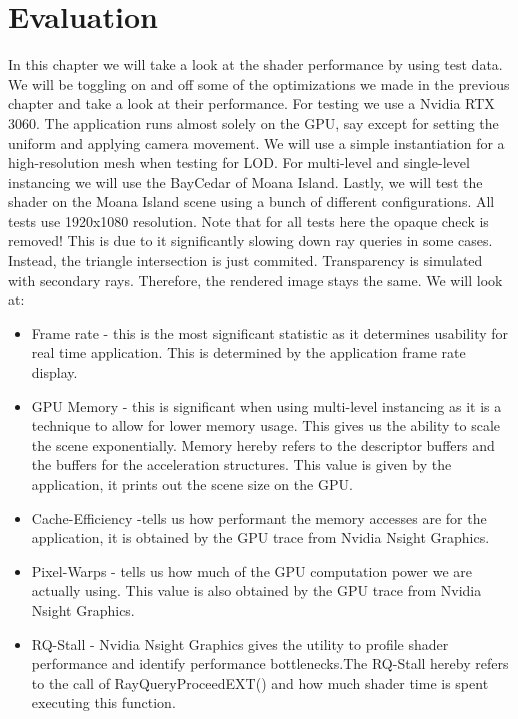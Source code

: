 \chapter{Evaluation}
In this chapter we will take a look at the shader performance by using test data. We will be toggling on and off some of the optimizations we made in the previous chapter and take a look at their performance. For testing we use a Nvidia RTX 3060. The application runs almost solely on the GPU, say except for setting the uniform and applying camera movement. We will use a simple instantiation for a high-resolution mesh when testing for LOD. For multi-level and single-level instancing we will use the BayCedar of Moana Island. Lastly, we will test the shader on the Moana Island scene using a bunch of different configurations. All tests use 1920x1080 resolution. Note that for all tests here the opaque check is removed! This is due to it significantly slowing down ray queries in some cases. Instead, the triangle intersection is just commited. Transparency is simulated with secondary rays. Therefore, the rendered image stays the same. We will look at:
\begin{itemize}
    \item Frame rate - this is the most significant statistic as it determines usability for real time application. This is determined by the application frame rate display.
    \item GPU Memory - this is significant when using multi-level instancing as it is a technique to allow for lower memory usage. This gives us the ability to scale the scene exponentially. Memory hereby refers to the descriptor buffers and the buffers for the acceleration structures. This value is given by the application, it prints out the scene size on the GPU.
    \item Cache-Efficiency -tells us how performant the memory accesses are for the application, it is obtained by the GPU trace from Nvidia Nsight Graphics.
    \item Pixel-Warps - tells us how much of the GPU computation power we are actually using. This value is also obtained by the GPU trace from Nvidia Nsight Graphics.
    \item RQ-Stall - Nvidia Nsight Graphics gives the utility to profile shader performance and identify performance bottlenecks.The RQ-Stall hereby refers to the call of RayQueryProceedEXT() and how much shader time is spent executing this function.

\end{itemize}
\newpage
